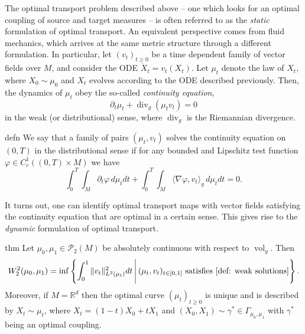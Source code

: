 \documentclass[11pt]{article}
\newcommand{\man}{M}
\begin{document}
The optimal transport problem described above -- one which looks for an optimal coupling of source and target measures -- is often referred to as the \textit{static} formulation of optimal transport. An equivalent perspective comes from fluid mechanics, which arrives at the same metric structure through a different formulation. In particular, let $(v_t)_{t \geq 0}$ be a time dependent family of vector fields over $\man$, and consider the ODE $\dot X_t = v_t(X_t)$. Let $\mu_t$ denote the law of $X_t$, where $X_0 \sim \mu_0$ and $X_t$ evolves according to the ODE described previously. Then, the dynamics of $\mu_t$ obey the so-called \textit{continuity equation},
\begin{equation}
    \partial_t\mu_t + \operatorname{div}_g (\mu_t v_t) = 0 \label{eq: balanced continuity eqn}
\end{equation}
in the weak (or distributional) sense, where $\operatorname{div}_g$ is the Riemannian divergence. 
\begin{restatable}{defn}{} \label{def: weak solutions}
    We say that a family of pairs $(\mu_t, v_t)$ solves the continuity equation on $(0, T)$ in the distributional sense if for any bounded and Lipschitz test function $\varphi \in C^1_c((0, T)\times \man)$ we have
    \[\int_0^T\int_{\man} \partial_t\varphi \, d\mu_tdt + \int_0^T\int_{\man} \langle\nabla\varphi,  v_t\rangle_g \, d\mu_tdt = 0.\]
\end{restatable}
It turns out, one can identify optimal transport maps with vector fields satisfying the continuity equation that are optimal in a certain sense. This gives rise to the \textit{dynamic} formulation of optimal transport.
\begin{restatable}{thm}{}
    Let $\mu_0, \mu_1 \in \mathcal{P}_{2}(\man)$ be absolutely continuous with respect to $\operatorname{vol}_g$. Then 
    \begin{equation*}
        W_2^2(\mu_0, \mu_1) = \inf \left\{\int_{0}^1\|v_t\|^2_{L^2(\mu_t)} dt \, \Bigg| \, (\mu_t, v_t)_{t \in [0,1]} \text{ satisfies \cref{def: weak solutions}}\right\}.
    \end{equation*}
    Moreover, if $M = \mathbb{R}^d$ then the optimal curve $(\mu_t)_{t\geq 0}$ is unique and is described by $X_t \sim \mu_t$, where $X_t = (1-t)X_0 + tX_1$ and $(X_0, X_1) \sim \gamma^* \in \Gamma_{\mu_0, \mu_1}$ with $\gamma^*$ being an optimal coupling.
\end{restatable}
\end{document}
